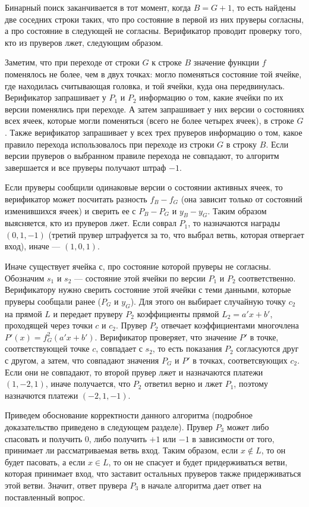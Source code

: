 \documentclass[14pt, a4paper, russian]{report}
\begin{document}
        Бинарный поиск заканчивается в тот момент, когда $B = G + 1$, то есть найдены две соседних строки таких, что про состояние в первой из них пруверы согласны, а про состояние в следующей не согласны. Верификатор проводит проверку того, кто из пруверов лжет, следующим образом.

        Заметим, что при переходе от строки $G$ к строке $B$ значение функции $f$ поменялось не более, чем в двух точках: могло поменяться состояние той ячейке, где находилась считывающая головка, и той ячейки, куда она передвинулась. Верификатор запрашивает у $P_1$ и $P_2$ информацию о том, какие ячейки по их версии поменялись при переходе. А затем запрашивает у них версии о состояниях всех ячеек, которые могли поменяться (всего не более четырех ячеек), в строке $G$. Также верификатор запрашивает у всех трех пруверов информацию о том, какое правило перехода использовалось при переходе из строки $G$ в строку $B$. Если версии пруверов о выбранном правиле перехода не совпадают, то алгоритм завершается и все пруверы получают штраф $-1$.

        Если пруверы сообщили одинаковые версии о состоянии активных ячеек, то верификатор может посчитать разность $f_B - f_G$ (она зависит только от состояний изменившихся ячеек) и сверить ее с $P_B - P_G$ и $y_B - y_G$. Таким образом выясняется, кто из пруверов лжет. Если соврал $P_1$, то назначаются награды $(0, 1, -1)$ (третий прувер штрафуется за то, что выбрал ветвь, которая отвергает вход), иначе --- $(1, 0, 1)$.

        Иначе существует ячейка $с$, про состояние которой пруверы не согласны. Обозначим $s_1$ и $s_2$ --- состояние этой ячейки по версии $P_1$ и $P_2$ соответственно. Верификатору нужно сверить состояние этой ячейки с теми данными, которые пруверы сообщали ранее ($P_G$ и $y_G$). Для этого он выбирает случайную точку $c_2$ на прямой $L$ и передает пруверу $P_2$ коэффициенты прямой $L_2 = a'x + b'$, проходящей через точки $c$ и $c_2$. Прувер $P_2$ отвечает коэффициентами многочлена $P'(x) = f^2_G(a'x + b')$. Верификатор проверяет, что значение $P'$ в точке, соответствующей точке $c$, совпадает с $s_2$, то есть показания $P_2$ согласуются друг с другом, а затем, что совпадают значения $P_G$ и $P'$ в точках, соответсвующих $c_2$. Если они не совпадают, то второй прувер лжет и назначаются платежи $(1, -2, 1)$, иначе получается, что $P_2$ ответил верно и лжет $P_1$, поэтому назначются платежи $(-2, 1, -1)$.

        Приведем обоснование корректности данного алгоритма (подробное доказательство приведено в следующем разделе). Прувер $P_3$ может либо спасовать и получить 0, либо получить $+1$ или $-1$ в зависимости от того, принимает ли рассматриваемая ветвь вход. Таким образом, если $x \notin L$, то он будет пасовать, а если $x \in L$, то он не спасует и будет придерживаться ветви, которая принимает вход, что заставит остальных пруверов также придерживаться этой ветви. Значит, ответ прувера $P_3$ в начале алгоритма дает ответ на поставленный вопрос.
\end{document}
